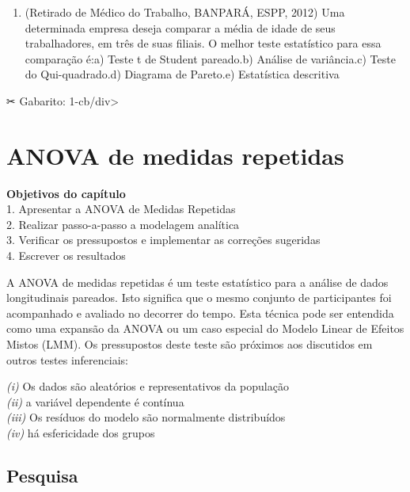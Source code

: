 \documentclass[
]{book}
\providecommand{\tightlist}{%
  \setlength{\itemsep}{0pt}\setlength{\parskip}{0pt}}
\begin{document}
\begin{question}

\begin{enumerate}
\def\labelenumi{\arabic{enumi}.}
\tightlist
\item
  (Retirado de Médico do Trabalho, BANPARÁ, ESPP, 2012) Uma determinada
  empresa deseja comparar a média de idade de seus trabalhadores, em
  três de suas filiais. O melhor teste estatístico para essa comparação
  é:a) Teste t de Student pareado.b) Análise de variância.c) Teste do
  Qui-quadrado.d) Diagrama de Pareto.e) Estatística descritiva
\end{enumerate}

\end{question}

✂ Gabarito: 1-cb/div\textgreater{}

\hypertarget{anova-de-medidas-repetidas}{%
\chapter{ANOVA de medidas repetidas}\label{anova-de-medidas-repetidas}}

\begin{objectives}
\textbf{Objetivos do capítulo}\\
1. Apresentar a ANOVA de Medidas Repetidas\\
2. Realizar passo-a-passo a modelagem analítica\\
3. Verificar os pressupostos e implementar as correções sugeridas\\
4. Escrever os resultados
\end{objectives}

A ANOVA de medidas repetidas é um teste estatístico para a análise de
dados longitudinais pareados. Isto significa que o mesmo conjunto de
participantes foi acompanhado e avaliado no decorrer do tempo. Esta
técnica pode ser entendida como uma expansão da ANOVA ou um caso
especial do Modelo Linear de Efeitos Mistos (LMM). Os pressupostos deste
teste são próximos aos discutidos em outros testes inferenciais:

\emph{(i)} Os dados são aleatórios e representativos da população\\
\emph{(ii)} a variável dependente é contínua\\
\emph{(iii)} Os resíduos do modelo são normalmente distribuídos\\
\emph{(iv)} há esfericidade dos grupos

\hypertarget{pesquisa-5}{%
\section{Pesquisa}\label{pesquisa-5}}
\end{document}
